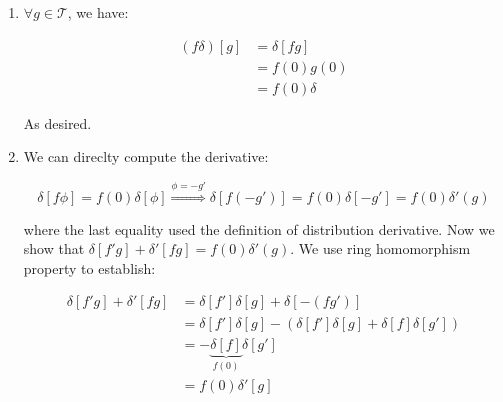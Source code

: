 \begin{mystsolution}\begin{enumerate}
\item $\forall g\in \mathcal T$, we have:

\begin{equation}
\begin{aligned}
(f\delta)[g] &= \delta[fg] \\
&=f(0)g(0) \\
&= f(0)\delta
\end{aligned}
\end{equation}


As desired.


\item We can direclty compute the derivative:

\begin{equation}
\delta[f\phi] = f(0)\delta[\phi] \overset{\phi=-g'}{\Longrightarrow} \delta[f(-g')] = f(0)\delta[-g'] = f(0)\delta'(g)
\end{equation}


where the last equality used the definition of distribution derivative.
Now we show that $\delta[f'g]+\delta'[fg]=f(0)\delta'(g)$. We use ring homomorphism property to establish:

\begin{equation}
\begin{aligned}
\delta[f'g]+\delta'[fg] &= \delta[f']\delta[g]+\delta[-(fg')] \\
&= \delta[f']\delta[g]-(\delta[f']\delta[g]+\delta[f]\delta[g']) \\
&= -\underbrace{\delta[f]}_{f(0)}\delta[g'] \\
&= f(0)\delta'[g] \\
\end{aligned}
\end{equation}
\end{enumerate}

\end{mystsolution}
